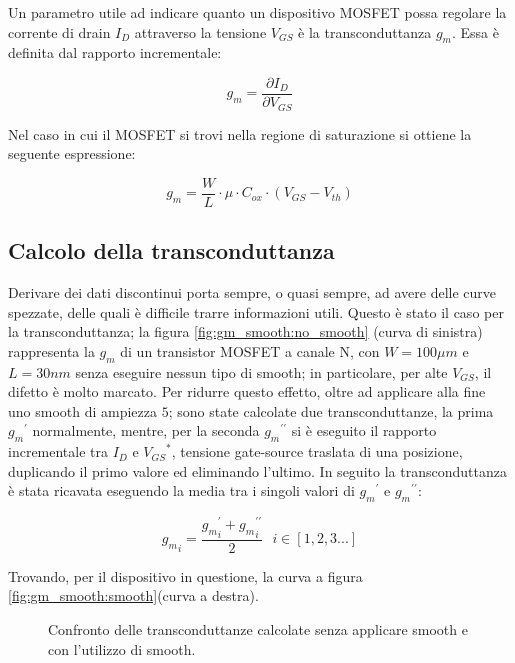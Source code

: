 Un parametro utile ad indicare quanto un dispositivo MOSFET possa regolare la corrente di drain $I_D$ attraverso la tensione $V_{GS}$ è la transconduttanza $g_m$. Essa è definita dal rapporto incrementale:

\begin{equation}
    g_m = \frac{\partial I_D}{\partial V_{GS}}
\end{equation}

Nel caso in cui il MOSFET si trovi nella regione di saturazione si ottiene la seguente espressione:

\begin{equation}
    g_m = \frac{W}{L} \cdot \mu \cdot C_{ox} \cdot (V_{GS} - V_{th})
    \label{eq:gm}
\end{equation}


\subsection{Calcolo della transconduttanza}
Derivare dei dati discontinui porta sempre, o quasi sempre, ad avere delle curve spezzate, delle quali è difficile trarre informazioni utili.
Questo è stato il caso per la transconduttanza; la figura \ref{fig:gm_smooth:no_smooth} (curva di sinistra) rappresenta la $g_m$ di un transistor  MOSFET a canale N, con $ W = 100\mu m$ e $L = 30 nm$ senza eseguire nessun tipo di smooth; in particolare, per alte $V_{GS}$, il difetto è molto marcato. Per ridurre questo effetto, oltre ad applicare alla fine uno smooth di ampiezza $5$; sono state calcolate due transconduttanze, la prima ${g_m}^{\prime}$ normalmente, mentre, per la seconda ${g_m}^{\prime \prime}$ si è eseguito il rapporto incrementale tra $I_D$ e ${V_{GS}}^*$, tensione gate-source traslata di una posizione, duplicando il primo valore ed eliminando l'ultimo. In seguito la transconduttanza è stata ricavata eseguendo la media tra i singoli valori di ${g_m}^\prime \text{ e } {g_m}^{\prime \prime}$:

\begin{equation}
    {g_m}_i = \frac{{g_m}_i^{\prime} + {g_m}_i^{\prime \prime}}{2} \text{ } i \in [1 , 2 , 3 . . .]
\end{equation}

Trovando, per il dispositivo in questione, la curva a figura \ref{fig:gm_smooth:smooth}(curva a destra).

\begin{figure}[h]
    \centering

    \caption[Confronto $g_m$ senza utilizzo di smooth e con utilizzo di smooth]{Confronto delle transconduttanze calcolate senza applicare smooth e con l'utilizzo di smooth.}
    \label{fig:gm_smooth}
\end{figure}


